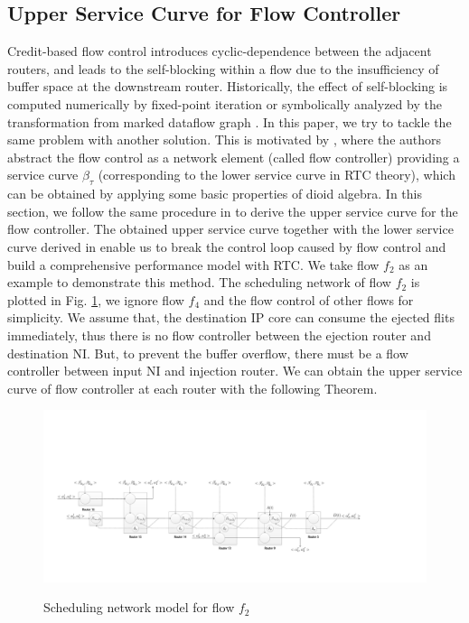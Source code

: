 \documentclass[10pt,journal]{IEEEtran}
\begin{document}
\subsection{Upper Service Curve for Flow Controller}\label{flowcontrol}
Credit-based flow control introduces cyclic-dependence between the adjacent routers, and leads to the self-blocking within a flow due to the insufficiency of buffer space at the downstream router. Historically, the effect of self-blocking is computed numerically by fixed-point iteration \cite{schioler2005network} or symbolically analyzed by the transformation from marked dataflow graph \cite{Thiele:2009:MPA:1629335.1629353}. In this paper, we try to tackle the same problem with another solution. This is motivated by \cite{qian2009analysis}, where the authors abstract the flow control as a network element (called flow controller) providing a service curve $\beta_{\tau}$ (corresponding to the lower service curve in RTC theory), which can be obtained by applying some basic properties of dioid algebra. In this section, we follow the same procedure in \cite{qian2009analysis} to derive the upper service curve for the flow controller. The obtained upper service curve together with the lower service curve derived in \cite{qian2009analysis} enable us to break the control loop caused by flow control and build a comprehensive performance model with RTC. We take flow $f_2$ as an example to demonstrate this method. The scheduling network of flow $f_2$ is plotted in Fig. \ref{f2}, we ignore flow $f_4$ and the flow control of other flows for simplicity. We assume that, the destination IP core can consume the ejected flits immediately, thus there is no flow controller between the ejection router and destination NI. But, to prevent the buffer overflow, there must be a flow controller between input NI and injection router. We can obtain the upper service curve of flow controller at each router with the following Theorem.
\begin{figure}
  \centering
  \includegraphics[scale=0.35]{figures/f2.pdf}\\
  \caption{Scheduling network model for flow $f_2$}\label{f2}
\end{figure}
\end{document}
